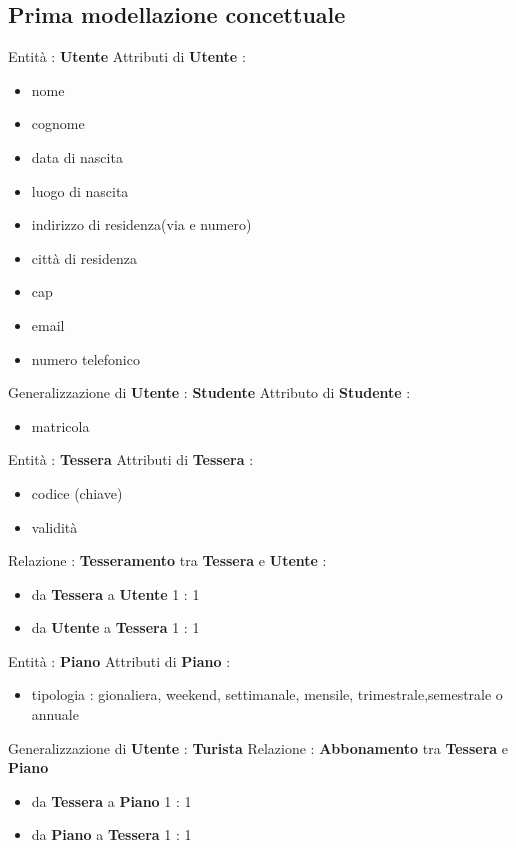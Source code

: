 \documentclass[a4paper,twoside]{article}
\begin{document}
\subsection{Prima modellazione concettuale}
Entità : \textbf{Utente}\newline
Attributi di \textbf{Utente} :
\begin{itemize}
 \item nome
 \item cognome
 \item data di nascita
 \item luogo di nascita
 \item indirizzo di residenza(via e numero)
 \item città di residenza
 \item cap
 \item email
 \item numero telefonico
\end{itemize}
Generalizzazione di \textbf{Utente} : \textbf{Studente}\newline
Attributo di \textbf{Studente} :
\begin{itemize}
 \item matricola
\end{itemize}
Entità : \textbf{Tessera}\newline
Attributi di \textbf{Tessera} :
\begin{itemize}
 \item codice (chiave)
 \item validità
\end{itemize}
Relazione : \textbf{Tesseramento} tra \textbf{Tessera} e \textbf{Utente} :
\begin{itemize}
 \item da \textbf{Tessera} a \textbf{Utente} 1 : 1
 \item da \textbf{Utente} a \textbf{Tessera} 1 : 1
\end{itemize}
Entità : \textbf{Piano}\newline
Attributi di \textbf{Piano} :
\begin{itemize}
 \item tipologia : gionaliera, weekend, settimanale, mensile, trimestrale,semestrale o annuale
\end{itemize}
Generalizzazione di \textbf{Utente} : \textbf{Turista}\newline
Relazione : \textbf{Abbonamento} tra \textbf{Tessera} e \textbf{Piano}
\begin{itemize}
 \item da \textbf{Tessera} a \textbf{Piano} 1 : 1
 \item da \textbf{Piano} a \textbf{Tessera} 1 : 1
\end{itemize}
\end{document}
